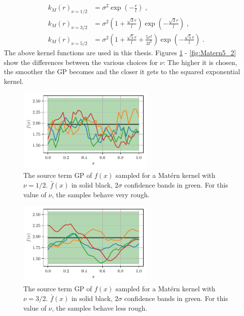 \documentclass[%
  a4paper,oneside,%
  11pt,%
  smallchapters,
  style=printdev,
  extramargin,
  green,%
  rgb, <cmyk>
  ]{tubsbook}
\begin{document}
\begin{align}
k_{M}(r)_{\nu = 1/2} &=   \sigma^2 \exp(- \frac{r}{l})  \; , \\
\label{eqn:Materns1}
k_{M}(r)_{\nu = 3/2} &=  \sigma^2 \left(      1+ \frac{\sqrt{3}r}{l}  	\right)  \exp(- \frac{\sqrt{3} r}{l})  \; , \\
k_{M}(r)_{\nu = 5/2} &=  \sigma^2\left(      1+ \frac{\sqrt{5}r}{l}  + \frac{5r^2}{3l^2}	\right)  \exp(- \frac{\sqrt{5} r}{l}) \; .
\label{eqn:Materns3}
\end{align}
%
The above kernel functions are used in this thesis. Figures \ref{fig:Matern1_2} - \ref{fig:Matern5_2} show the differences between the various choices for $\nu$: The higher it is chosen, the smoother the GP becomes and the closer it gets to the squared exponential kernel.
\begin{figure}[!ht]
\begin{center}

\includegraphics[width=0.6\textwidth]{pics/matern1_2_f_sampled}
\caption[Samples from a GP with a Mat\'ern kernel 1]{The source term GP of $f(x)$ sampled for a Mat\'ern kernel with $\nu=1/2$. $\bar{f}(x)$ in solid black, $2\sigma$ confidence bands in green. For this value of $\nu$, the samples behave very rough.}
\label{fig:Matern1_2}

\end{center}
\end{figure}

\begin{figure}[!ht]
\begin{center}

\includegraphics[width=0.6\textwidth]{pics/matern3_2_f_sampled}
\caption[Samples from a GP with a Mat\'ern kernel 2]{The source term GP of $f(x)$ sampled for a Mat\'ern kernel with $\nu=3/2$. $\bar{f}(x)$ in solid black, $2\sigma$ confidence bands in green. For this value of $\nu$, the samples behave less rough.}
\label{fig:Matern3_2}

\end{center}
\end{figure}
\end{document}

